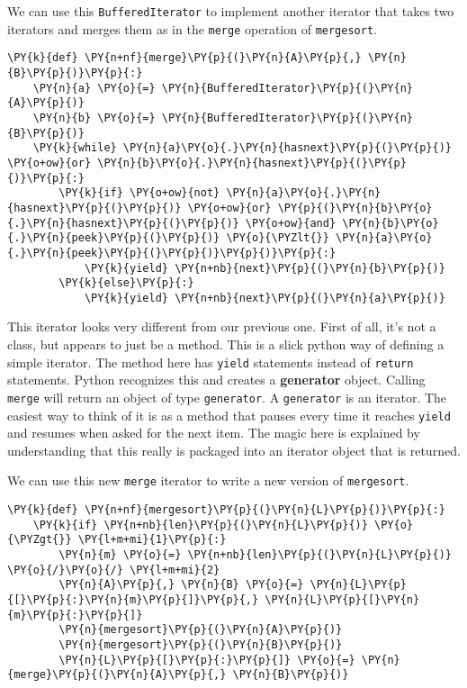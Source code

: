 We can use this \texttt{BufferedIterator} to implement another iterator that takes two iterators and merges them as in the \texttt{merge} operation of \texttt{mergesort}.

\begin{Verbatim}[commandchars=\\\{\}]
\PY{k}{def} \PY{n+nf}{merge}\PY{p}{(}\PY{n}{A}\PY{p}{,} \PY{n}{B}\PY{p}{)}\PY{p}{:}
    \PY{n}{a} \PY{o}{=} \PY{n}{BufferedIterator}\PY{p}{(}\PY{n}{A}\PY{p}{)}
    \PY{n}{b} \PY{o}{=} \PY{n}{BufferedIterator}\PY{p}{(}\PY{n}{B}\PY{p}{)}
    \PY{k}{while} \PY{n}{a}\PY{o}{.}\PY{n}{hasnext}\PY{p}{(}\PY{p}{)} \PY{o+ow}{or} \PY{n}{b}\PY{o}{.}\PY{n}{hasnext}\PY{p}{(}\PY{p}{)}\PY{p}{:}
        \PY{k}{if} \PY{o+ow}{not} \PY{n}{a}\PY{o}{.}\PY{n}{hasnext}\PY{p}{(}\PY{p}{)} \PY{o+ow}{or} \PY{p}{(}\PY{n}{b}\PY{o}{.}\PY{n}{hasnext}\PY{p}{(}\PY{p}{)} \PY{o+ow}{and} \PY{n}{b}\PY{o}{.}\PY{n}{peek}\PY{p}{(}\PY{p}{)} \PY{o}{\PYZlt{}} \PY{n}{a}\PY{o}{.}\PY{n}{peek}\PY{p}{(}\PY{p}{)}\PY{p}{)}\PY{p}{:}
            \PY{k}{yield} \PY{n+nb}{next}\PY{p}{(}\PY{n}{b}\PY{p}{)}
        \PY{k}{else}\PY{p}{:}
            \PY{k}{yield} \PY{n+nb}{next}\PY{p}{(}\PY{n}{a}\PY{p}{)}
\end{Verbatim}



This iterator looks very different from our previous one.
First of all, it's not a class, but appears to just be a method.
This is a slick python way of defining a simple iterator.
The method here has \texttt{yield} statements instead of \texttt{return} statements.
Python recognizes this and creates a \textbf{generator} object.
Calling \texttt{merge} will return an object of type \texttt{generator}.
A \texttt{generator} is an iterator.
The easiest way to think of it is as a method that pauses every time it reaches \texttt{yield} and resumes when asked for the next item.
The magic here is explained by understanding that this really is packaged into an iterator object that is returned.


We can use this new \texttt{merge} iterator to write a new version of \texttt{mergesort}.

\begin{Verbatim}[commandchars=\\\{\}]
\PY{k}{def} \PY{n+nf}{mergesort}\PY{p}{(}\PY{n}{L}\PY{p}{)}\PY{p}{:}
    \PY{k}{if} \PY{n+nb}{len}\PY{p}{(}\PY{n}{L}\PY{p}{)} \PY{o}{\PYZgt{}} \PY{l+m+mi}{1}\PY{p}{:}
        \PY{n}{m} \PY{o}{=} \PY{n+nb}{len}\PY{p}{(}\PY{n}{L}\PY{p}{)} \PY{o}{/}\PY{o}{/} \PY{l+m+mi}{2}
        \PY{n}{A}\PY{p}{,} \PY{n}{B} \PY{o}{=} \PY{n}{L}\PY{p}{[}\PY{p}{:}\PY{n}{m}\PY{p}{]}\PY{p}{,} \PY{n}{L}\PY{p}{[}\PY{n}{m}\PY{p}{:}\PY{p}{]}
        \PY{n}{mergesort}\PY{p}{(}\PY{n}{A}\PY{p}{)}
        \PY{n}{mergesort}\PY{p}{(}\PY{n}{B}\PY{p}{)}
        \PY{n}{L}\PY{p}{[}\PY{p}{:}\PY{p}{]} \PY{o}{=} \PY{n}{merge}\PY{p}{(}\PY{n}{A}\PY{p}{,} \PY{n}{B}\PY{p}{)}
\end{Verbatim}


